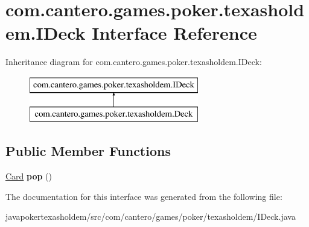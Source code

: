 \hypertarget{interfacecom_1_1cantero_1_1games_1_1poker_1_1texasholdem_1_1_i_deck}{}\section{com.\+cantero.\+games.\+poker.\+texasholdem.\+I\+Deck Interface Reference}
\label{interfacecom_1_1cantero_1_1games_1_1poker_1_1texasholdem_1_1_i_deck}
Inheritance diagram for com.\+cantero.\+games.\+poker.\+texasholdem.\+I\+Deck\+:\begin{figure}[H]
\begin{center}
\leavevmode
\includegraphics[height=2.000000cm]{interfacecom_1_1cantero_1_1games_1_1poker_1_1texasholdem_1_1_i_deck}
\end{center}
\end{figure}
\subsection*{Public Member Functions}
\begin{DoxyCompactItemize}
\item 
\hypertarget{interfacecom_1_1cantero_1_1games_1_1poker_1_1texasholdem_1_1_i_deck_ad4867d2417c2d2b266697805dde0b302}{}\hyperlink{classcom_1_1cantero_1_1games_1_1poker_1_1texasholdem_1_1_card}{Card} {\bfseries pop} ()\label{interfacecom_1_1cantero_1_1games_1_1poker_1_1texasholdem_1_1_i_deck_ad4867d2417c2d2b266697805dde0b302}

\end{DoxyCompactItemize}


The documentation for this interface was generated from the following file\+:\begin{DoxyCompactItemize}
\item 
javapokertexasholdem/src/com/cantero/games/poker/texasholdem/I\+Deck.\+java\end{DoxyCompactItemize}
